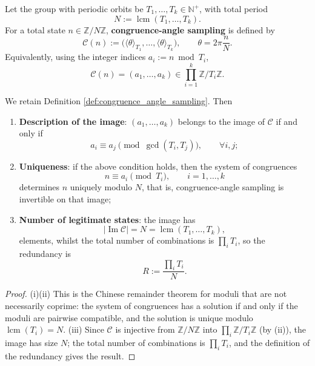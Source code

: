 \begin{definition}\label{def:congruence_angle_sampling}
Let the group with periodic orbits be $T_1,\dots,T_k\in\mathbb{N}^+$, with total period
\[
N:=\operatorname{lcm}(T_1,\dots,T_k).
\]
For a total state $n\in\mathbb{Z}/N\mathbb{Z}$, \textbf{congruence-angle sampling} is defined by
\[
\mathcal{C}(n):=\big(\langle\theta\rangle_{T_1},\dots,\langle\theta\rangle_{T_k}\big),
\qquad \theta=2\pi\frac{n}{N}.
\]
Equivalently, using the integer indices $a_i:=n\bmod T_i$,
\[
\mathcal{C}(n)=(a_1,\dots,a_k)\in\prod_{i=1}^k\mathbb{Z}/T_i\mathbb{Z}.
\]
\end{definition}

\begin{theorem}\label{thm:congruence_angle_crt}
We retain Definition \ref{def:congruence_angle_sampling}. Then
\begin{enumerate}[label=(\roman*)]
    \item \textbf{Description of the image}: $(a_1,\dots,a_k)$ belongs to the image of $\mathcal{C}$ if and only if
    \[
    a_i\equiv a_j\pmod{\gcd(T_i,T_j)},\qquad\forall i,j;
    \]
    \item \textbf{Uniqueness}: if the above condition holds, then the system of congruences
    \[
    n\equiv a_i\pmod{T_i},\qquad i=1,\dots,k
    \]
    determines $n$ uniquely modulo $N$, that is, congruence-angle sampling is invertible on that image;
    \item \textbf{Number of legitimate states}: the image has
    \[
    |\operatorname{Im}\mathcal{C}|=N=\operatorname{lcm}(T_1,\dots,T_k),
    \]
    elements, whilst the total number of combinations is $\prod_i T_i$, so the redundancy is
    \[
    R:=\frac{\prod_i T_i}{N}.
    \]
\end{enumerate}
\end{theorem}

\begin{proof}
(i)(ii) This is the Chinese remainder theorem for moduli that are not necessarily coprime: the system of congruences has a solution if and only if the moduli are pairwise compatible, and the solution is unique modulo $\operatorname{lcm}(T_i)=N$. (iii) Since $\mathcal{C}$ is injective from $\mathbb{Z}/N\mathbb{Z}$ into $\prod_i\mathbb{Z}/T_i\mathbb{Z}$ (by (ii)), the image has size $N$; the total number of combinations is $\prod_i T_i$, and the definition of the redundancy gives the result.
\end{proof}

